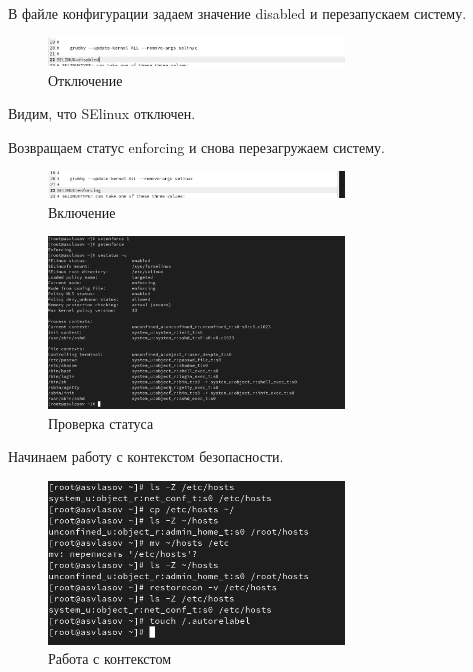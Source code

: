 \documentclass[
  12pt,
  a4paper,
  DIV=11,
  numbers=noendperiod]{scrreprt}
\begin{document}
В файле конфигурации задаем значение disabled и перезапускаем систему.

\begin{figure}

{\centering \includegraphics[width=0.7\textwidth,height=\textheight]{image/2.png}

}

\caption{Отключение}

\end{figure}%

Видим, что SElinux отключен.

Возвращаем статус enforcing и снова перезагружаем систему.

\begin{figure}

{\centering \includegraphics[width=0.7\textwidth,height=\textheight]{image/3.png}

}

\caption{Включение}

\end{figure}%
\begin{figure}

{\centering \includegraphics[width=0.7\textwidth,height=\textheight]{image/4.png}

}

\caption{Проверка статуса}

\end{figure}%

Начинаем работу с контекстом безопасности.

\begin{figure}

{\centering \includegraphics[width=0.7\textwidth,height=\textheight]{image/5.png}

}

\caption{Работа с контекстом}

\end{figure}%
\end{document}
